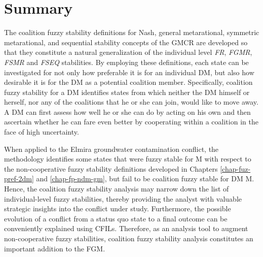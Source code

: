 \section{Summary}

The coalition fuzzy stability definitions for Nash, general metarational, symmetric metarational, and sequential stability concepts of the GMCR are developed so that they constitute a natural generalization of the individual level \emph{FR}, \emph{FGMR}, \emph{FSMR} and \emph{FSEQ} stabilities. By employing these definitions, each state can be investigated for not only how preferable it is for an individual DM, but also how desirable it is for the DM as a potential coalition member. Specifically, coalition fuzzy stability for a DM identifies states from which neither the DM himself or herself, nor any of the coalitions that he or she can join, would like to move away. A DM can first assess how well he or she can do by acting on his own and then ascertain whether he can fare even better by cooperating within a coalition in the face of high uncertainty.

When applied to the Elmira groundwater contamination conflict, the methodology identifies some states that were fuzzy stable for M with respect to the non-cooperative fuzzy stability definitions developed in Chapters \ref{chap-fuz-pref-2dm} and \ref{chap-fp-ndm-gm}, but fail to be coalition fuzzy stable for DM M. Hence, the coalition fuzzy stability analysis may narrow down the list of individual-level fuzzy stabilities, thereby providing the analyst with valuable strategic insights into the conflict under study. Furthermore, the possible evolution of a conflict from a status quo state to a final outcome can be conveniently explained using CFILs. Therefore, as an analysis tool to augment non-cooperative fuzzy stabilities, coalition fuzzy stability analysis constitutes an important addition to the FGM.




